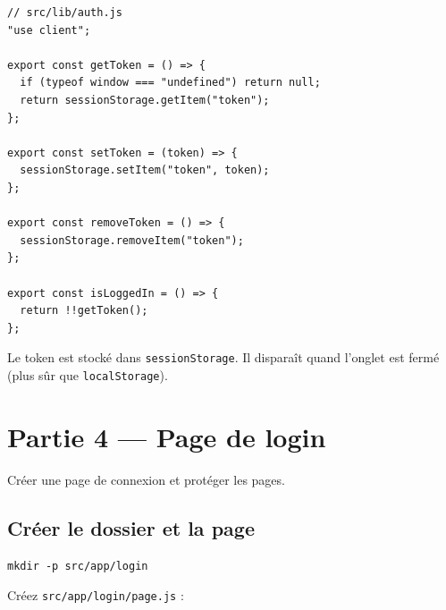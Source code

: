 \documentclass[11pt,a4paper]{article}
\begin{document}
\begin{lstlisting}
// src/lib/auth.js
"use client";

export const getToken = () => {
  if (typeof window === "undefined") return null;
  return sessionStorage.getItem("token");
};

export const setToken = (token) => {
  sessionStorage.setItem("token", token);
};

export const removeToken = () => {
  sessionStorage.removeItem("token");
};

export const isLoggedIn = () => {
  return !!getToken();
};
\end{lstlisting}

Le token est stocké dans \texttt{sessionStorage}. Il disparaît quand l'onglet est fermé (plus sûr que \texttt{localStorage}).

\section{Partie 4 --- Page de login}

\begin{objectifbox}
Créer une page de connexion et protéger les pages.
\end{objectifbox}

\subsection{Créer le dossier et la page}

\begin{lstlisting}[style=terminal]
mkdir -p src/app/login
\end{lstlisting}

Créez \texttt{src/app/login/page.js} :
\end{document}
